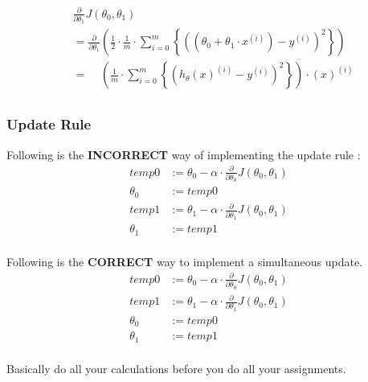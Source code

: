 \[
\begin{aligned}
	& \frac{\partial}{\partial \theta_1} J(\theta_{0}, \theta_{1}) \\
	& =
	\frac{\partial}{\partial \theta_1}
	\left(
		\frac{1}{2}
		\cdot \frac{1}{m}
		\cdot \sum_{i=0}^{m}
			\left\{
				\left(
					\left(
						\theta_{0} + \theta_{1} \cdot x^{(i)}
					\right)
					- y^{(i)}
				\right)^{2}
			\right\}
	\right)
	\\
	& =
	\phantom{ \frac{\partial}{\partial \theta_0} }
	\left(
	\frac{1}{m}
	\cdot \sum_{i=0}^{m}
		\left\{
			\left(
				h_{\theta}(x)^{(i)} - y^{(i)}
			\right)^{2}
		\right\}
	\right)
	\cdot (x)^{\left(i\right)}
	\\
\end{aligned}
\]
\pagebreak
\subsubsectionend
\subsubsection{Update Rule}
\label{sssec:update_rule}

Following is the \textbf{INCORRECT} way of implementing the update rule :
\[
\begin{aligned}
	temp0 &:= \theta_0 - \alpha
	\cdot \frac{\partial}{\partial \theta_0} J(\theta_0,\theta_1) \\
	\theta_0 &:= temp0 \\
	temp1 &:= \theta_1 - \alpha
	\cdot \frac{\partial}{\partial \theta_1} J(\theta_0,\theta_1) \\
	\theta_1 &:= temp1 \\
\end{aligned}
\]

Following is the \textbf{CORRECT} way to implement a simultaneous update.
\[
\begin{aligned}
	temp0 &:= \theta_0 - \alpha
	\cdot \frac{\partial}{\partial \theta_0} J(\theta_0,\theta_1) \\
	temp1 &:= \theta_1 - \alpha
	\cdot \frac{\partial}{\partial \theta_1} J(\theta_0,\theta_1) \\
	\theta_0 &:= temp0 \\
	\theta_1 &:= temp1 \\
\end{aligned}
\]

Basically do all your calculations before you do all your assignments.

\subsubsectionend

\sectionend


